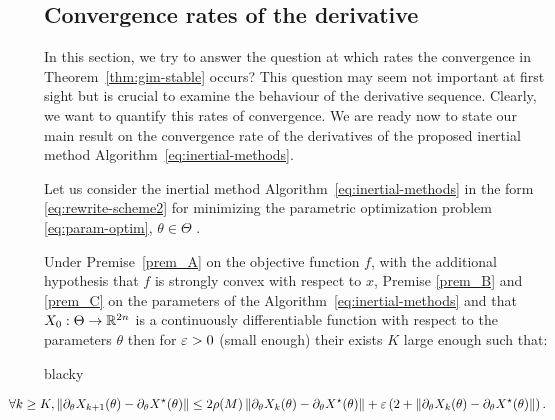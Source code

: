 \subsection{Convergence rates of the derivative }\label{subsec:conv-ad-im}
In this section, we try to answer the question at which rates the convergence in Theorem~\ref{thm:gim-stable} occurs? This question may seem not important at first sight but is crucial to examine the behaviour of the derivative sequence. Clearly, we want to quantify this rates of convergence. We are ready now to state our main result on the convergence rate of the derivatives of the proposed inertial method Algorithm~\ref{eq:inertial-methods}.
\begin{theorem}\label{thm:conv-rat-der} Let us consider the inertial method Algorithm~\ref{eq:inertial-methods} in the form \eqref{eq:rewrite-scheme2} for minimizing the parametric optimization problem \eqref{eq:param-optim}, $ \theta\in\Theta$ . 

Under Premise~\ref{prem_A} on the objective function $f$, with the additional hypothesis that $f$ is strongly convex with respect to $x$, Premise \ref{prem_B} and \ref{prem_C} on the parameters of the Algorithm~\ref{eq:inertial-methods}  and that $X_0:\Theta\to\mathbb{R}^{2n}$ is a continuously differentiable function with respect to the parameters $\theta$ then for $\varepsilon>0$ (small enough) their exists $K$ large enough such that:
\begin{centerbox}{black}{}y

\begin{multline}\label{thm:conv-rat-der}
\hspace{-1cm}\forall k\geq K, \normm{\partial_{\theta}X_{k+1}(\theta)-\partial_{\theta}X^{\star}(\theta)}\leq 2\rho\pa{M}\normm{\partial_{\theta}X_k(\theta)-\partial_{\theta}X^{\star}(\theta)}+\eps\Ppa{2+\normm{\partial_{\theta}X_k(\theta)-\partial_{\theta}X^{\star}(\theta)}}.
\end{multline}

\end{centerbox}
\end{theorem}

